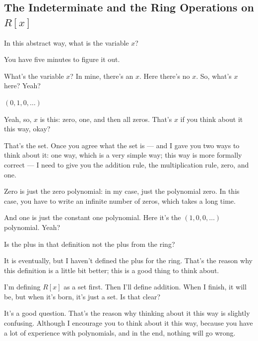 \subsection{The Indeterminate and the Ring Operations on \texorpdfstring{$R[x]$}{R[x]}}

\begin{speech}[01:23:58 - 01:24:24]
In this abstract way, what is the variable $x$? 

You have five minutes to figure it out.

What's the variable $x$? In mine, there's an $x$. Here there's no $x$. So, what's $x$ here? Yeah?
\end{speech}

\begin{student}
$(0, 1, 0, \dots)$
\end{student}

\begin{speech}[01:24:27 - 01:25:20]
Yeah, so, $x$ is this:  zero, one, and then all zeros. That's $x$ if you think about it this way, okay?

That's the set. Once you agree what the set is --- and I gave you two ways to think about it: one way, which is a very simple way; this way is more formally correct --- I need to give you the addition rule, the multiplication rule, zero, and one. 

Zero is just the zero polynomial: in my case, just the polynomial zero. In this case, you have to write an infinite number of zeros, which takes a long time. 

And one is just the constant one polynomial. Here it's the $(1, 0, 0, \dots)$ polynomial.  Yeah?
\end{speech}

\begin{student}
Is the plus in that definition not the plus from the ring?
\end{student}

\begin{speech}[01:25:25 - 01:26:05]
It is eventually, but I haven't defined the plus for the ring. That's the reason why this definition is a little bit better; this is a good thing to think about.

I'm defining $R[x]$ as a set first. Then I'll define addition. When I finish, it will be, but when it's born, it's just a set. Is that clear?

It's a good question. That's the reason why thinking about it this way is slightly confusing. Although I encourage you to think about it this way, because you have a lot of experience with polynomials, and in the end, nothing will go wrong.
\end{speech}

